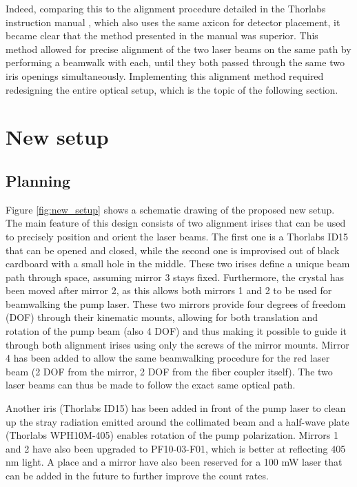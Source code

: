 \documentclass[a4paper,
DIV=13,
12pt,
BCOR=10mm,
department=FakEI,
twoside,
parskip=half,
automark,
logostyle=flat,
]{OTHRartcl}
\begin{document}
Indeed, comparing this to the alignment procedure detailed in the Thorlabs instruction manual \cite{thorlabs_manual}, which also uses the same axicon for detector placement, it became clear that the method presented in the manual was superior. This method allowed for precise alignment of the two laser beams on the same path by performing a beamwalk with each, until they both passed through the same two iris openings simultaneously. Implementing this alignment method required redesigning the entire optical setup, which is the topic of the following section.











\section{New setup}

\subsection{Planning}


Figure \ref{fig:new_setup} shows a schematic drawing of the proposed new setup. The main feature of this design consists of two alignment irises that can be used to precisely position and orient the laser beams. The first one is a Thorlabs ID15 that can be opened and closed, while the second one is improvised out of black cardboard with a small hole in the middle. These two irises define a unique beam path through space, assuming mirror 3 stays fixed. Furthermore, the crystal has been moved after mirror 2, as this allows both mirrors 1 and 2 to be used for beamwalking the pump laser. These two mirrors provide four degrees of freedom (DOF) through their kinematic mounts, allowing for both translation and rotation of the pump beam (also 4 DOF) and thus making it possible to guide it through both alignment irises using only the screws of the mirror mounts. Mirror 4 has been added to allow the same beamwalking procedure for the red laser beam (2 DOF from the mirror, 2 DOF from the fiber coupler itself). The two laser beams can thus be made to follow the exact same optical path.

Another iris (Thorlabs ID15) has been added in front of the pump laser to clean up the stray radiation emitted around the collimated beam and a half-wave plate (Thorlabs WPH10M-405) enables rotation of the pump polarization. Mirrors 1 and 2 have also been upgraded to PF10-03-F01, which is better at reflecting 405 nm light. A place and a mirror have also been reserved for a 100 mW laser that can be added in the future to further improve the count rates.
\end{document}
